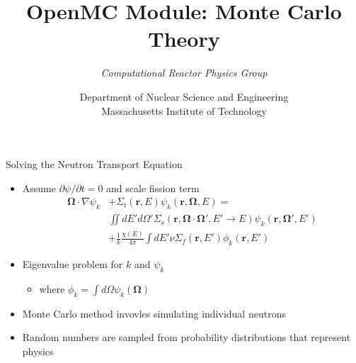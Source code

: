 \documentclass[serif]{beamer}
\title{OpenMC Module: Monte Carlo Theory}
\author{\emph{Computational Reactor Physics Group}}
\date{\normalsize Department of Nuclear Science and Engineering\\
                  Massachusetts Institute of Technology}
\begin{document}

\frame{\titlepage}\logo{} %


\begin{frame}{Solving the Neutron Transport Equation}

  \begin{itemize}
    \item<1-> Assume $\partial\psi / \partial t = 0$ and scale fission term
      \begin{equation*}
        \begin{split}
          \boldsymbol{\Omega} \cdot \nabla \psi_k &+ \Sigma_t(\mathbf{r},E)
          \psi_k(\mathbf{r},\boldsymbol\Omega,E) = \\ &\iint dE' d\Omega'
          \Sigma_s(\mathbf{r},\boldsymbol\Omega\cdot\boldsymbol\Omega',E'\to
          E)\psi_k(\mathbf{r},\boldsymbol\Omega',E') \\ &+ \frac{1}{k} \frac{\chi(E)}{4\pi}
          \int dE' \nu \Sigma_f(\mathbf{r},E')\phi_k(\mathbf{r},E')
        \end{split}
      \end{equation*}\vfill
    \item<1-> Eigenvalue problem for $k$ and $\psi_k$\vfill
      \begin{itemize} \item where $\phi_k = \int d\Omega\psi_k(\boldsymbol\Omega)$ \end{itemize}
    \item<1-> Monte Carlo method invovles simulating individual neutrons\vfill
    \item<1-> Random numbers are sampled from probability distributions that
              represent physics 
  \end{itemize}

\end{frame}

\end{document}
